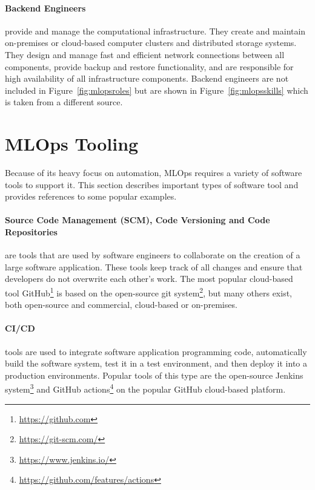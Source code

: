 \paragraph*{Backend Engineers} provide and manage the computational infrastructure. They create and maintain on-premises or cloud-based computer clusters and distributed storage systems. They design and manage fast and efficient network connections between all components, provide backup and restore functionality, and are responsible for high availability of all infrastructure components. Backend engineers are not included in Figure~\ref{fig:mlopsroles} but are shown in Figure~\ref{fig:mlopsskills} which is taken from a different source.

\section{MLOps Tooling}

Because of its heavy focus on automation, MLOps requires a variety of software tools to support it. This section describes important types of software tool and provides references to some popular examples.

\paragraph*{Source Code Management (SCM), Code Versioning and Code Repositories} are tools that are used by software engineers to collaborate on the creation of a large software application. These tools keep track of all changes and ensure that developers do not overwrite each other's work. The most popular cloud-based tool GitHub\footnote{\url{https://github.com}} is based on the open-source git system\footnote{\url{https://git-scm.com/}}, but many others exist, both open-source and commercial, cloud-based or on-premises. 

\paragraph*{CI/CD} tools are used to integrate software application programming code, automatically build the software system, test it in a test environment, and then deploy it into a production environments. Popular tools of this type are the open-source Jenkins system\footnote{\url{https://www.jenkins.io/}} and GitHub actions\footnote{\url{https://github.com/features/actions}} on the popular GitHub cloud-based platform.

